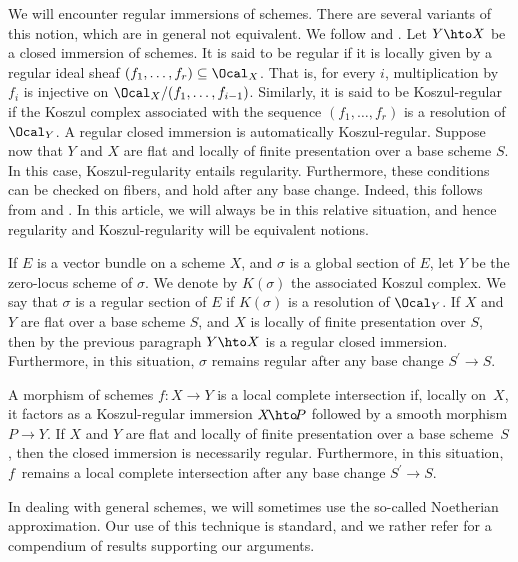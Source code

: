 We will encounter regular immersions of schemes. There are several variants of this notion, which are in general not equivalent. We follow \cite[\href{https://stacks.math.columbia.edu/tag/0638}{0638}]{stacks-project} and \cite[\href{https://stacks.math.columbia.edu/tag/067M}{067M}]{stacks-project}. Let $Y\hto X$ be a closed immersion of schemes. It is said to be regular if it is locally given by a regular ideal sheaf $(f_{1},\ldots, f_{r})\subseteq\Ocal_{X}$. That is, for every $i$, multiplication by $f_{i}$ is injective on $\Ocal_{X}/(f_{1},\ldots, f_{i-1})$. Similarly, it is said to be Koszul-regular if the Koszul complex associated with the sequence $(f_{1},\ldots, f_{r})$ is a resolution of $\Ocal_{Y}$. A regular closed immersion is automatically Koszul-regular. Suppose now that $Y$ and $X$ are flat and locally of finite presentation over a base scheme $S$. In this case, Koszul-regularity entails regularity. Furthermore, these conditions can be checked on fibers, and hold after any base change. Indeed, this follows from \cite[\href{https://stacks.math.columbia.edu/tag/063K}{063K}]{stacks-project} and \cite[Prop.\,19.2.4]{EGAIV4}. In this article, we will always be in this relative situation, and hence regularity and Koszul-regularity will be equivalent notions.

If $E$ is a vector bundle on a scheme $X$, and $\sigma$ is a global section of $E$, let $Y$ be the zero-locus scheme of $\sigma$. We denote by $K(\sigma)$ the associated Koszul complex. We say that $\sigma$ is a regular section of $E$ if $K(\sigma)$ is a resolution of $\Ocal_{Y}$. If $X$ and $Y$ are flat over a base scheme $S$, and $X$ is locally of finite presentation over $S$, then by the previous paragraph $Y\hto X$ is a regular closed immersion. Furthermore, in this situation, $\sigma$ remains regular after any base change $S^{\prime}\to S$.\enlargethispage{-2\baselineskip}%

A morphism of schemes $f\colon X\to Y$ is a local complete intersection if, locally on~$X$, it factors as a Koszul-regular immersion $X\!\hto\! P$ followed by a smooth morphism $P\!\to\! Y$. If $X$ and $Y$ are flat and locally of finite presentation over a base scheme~$S$, then the closed immersion is necessarily regular. Furthermore, in this situation, $f$~remains a local complete intersection after any base change $S^{\prime}\to S$.

In dealing with general schemes, we will sometimes use the so-called Noetherian approximation. Our use of this technique is standard, and we rather refer \cite[\href{https://stacks.math.columbia.edu/tag/01YT}{01YT}]{stacks-project} for a compendium of results supporting our arguments.

